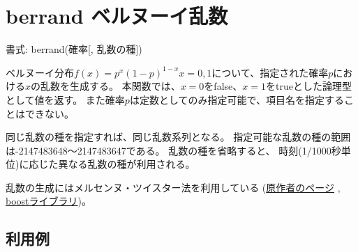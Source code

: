 
%

\section{berrand ベルヌーイ乱数\label{sect:berrand}}

書式: berrand(確率[, 乱数の種])

ベルヌーイ分布$f(x)=p^x(1-p)^{1-x} x=0,1$について、指定された確率$p$における$x$の乱数を生成する。
本関数では、$x=0$をfalse、$x=1$をtrueとした論理型として値を返す。
また確率$p$は定数としてのみ指定可能で、項目名を指定することはできない。

同じ乱数の種を指定すれば、同じ乱数系列となる。
指定可能な乱数の種の範囲は-2147483648〜2147483647である。
乱数の種を省略すると、
時刻(1/1000秒単位)に応じた異なる乱数の種が利用される。

乱数の生成にはメルセンヌ・ツイスター法を利用している
(\href{http://www.math.sci.hiroshima-u.ac.jp/~m-mat/MT/emt.html}{原作者のページ}
, \href{http://www.boost.org/doc/libs/1_54_0/doc/html/boost_random.html}{boostライブラリ})。

\subsection*{利用例}


%


